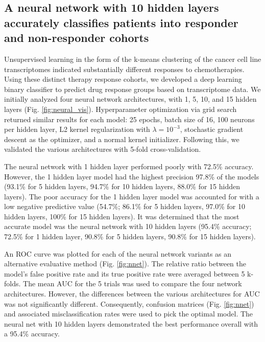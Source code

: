 \documentclass[10pt, letterpaper]{article}
\begin{document}
\begin{multicols*}{2}
\subsection{A neural network with 10 hidden layers accurately classifies patients into responder and non-responder cohorts}
Unsupervised learning in the form of the k-means clustering of the cancer cell line transcriptomes indicated substantially different responses to chemotherapies. Using these distinct therapy response cohorts, we developed a deep learning binary classifier to predict drug response groups based on transcriptome data. We initially analyzed four neural network architectures, with 1, 5, 10, and 15 hidden layers (Fig. \ref{fig:neural_vis}). Hyperparameter optimization via grid search returned similar results for each model: 25 epochs, batch size of 16, 100 neurons per hidden layer, L2 kernel regularization with $\lambda=10^{-3}$, stochastic gradient descent as the optimizer, and a normal kernel initializer. Following this, we validated the various architectures with 5-fold cross-validation.

The neural network with 1 hidden layer performed poorly with 72.5\% accuracy. However, the 1 hidden layer model had the highest precision 97.8\% of the models (93.1\% for 5 hidden layers, 94.7\% for 10 hidden layers, 88.0\% for 15 hidden layers). The poor accuracy for the 1 hidden layer model was accounted for with a low negative predictive value (54.7\%; 86.1\% for 5 hidden layers, 97.0\% for 10 hidden layers, 100\% for 15 hidden layers). It was determined that the most accurate model was the neural network with 10 hidden layers (95.4\% accuracy; 72.5\% for 1 hidden layer, 90.8\% for 5 hidden layers, 90.8\% for 15 hidden layers).

An ROC curve was plotted for each of the neural network variants as an alternative evaluative method (Fig. \ref{fig:nnet}). The relative ratio between the model’s false positive rate and its true positive rate were averaged between 5 k-folds. The mean AUC for the 5 trials was used to compare the four network architectures. However, the differences between the various architectures for AUC was not significantly different. Consequently, confusion matrices (Fig. \ref{fig:nnet}) and associated misclassification rates were used to pick the optimal model. The neural net with 10 hidden layers demonstrated the best performance overall with a 95.4\% accuracy.



\end{multicols*}
\end{document}
